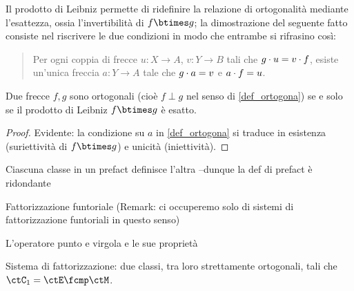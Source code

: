 Il prodotto di Leibniz permette di ridefinire la relazione di ortogonalità mediante l'esattezza, ossia l'invertibilità di \(f\leib g\); la dimostrazione del seguente fatto consiste nel riscrivere le due condizioni in modo che entrambe si rifrasino così:
\begin{quote}
 Per ogni coppia di frecce \(u \colon X\to A\), \(v \colon Y\to B\) tali che \(g\cdot u=v\cdot f\), esiste un'unica freccia \(a \colon Y\to A\) tale che \(g\cdot a=v\) e \(a\cdot f=u\).
\end{quote}
\begin{proposition}
 Due frecce \(f,g\) sono ortogonali (cioè \(f\perp g\) nel senso di \ref{def_ortogona}) se e solo se il prodotto di Leibniz \(f\leib g\) è esatto.
\end{proposition}
\begin{proof}
 Evidente: la condizione su \(a\) in \ref{def_ortogona} si traduce in esistenza (suriettività di \(f\leib g\)) e unicità (iniettività).
\end{proof}
\begin{definition}
 \Todo{}
\end{definition}
\begin{proposition}
 Ciascuna classe in un prefact definisce l'altra --dunque la def di prefact è ridondante
\end{proposition}
\begin{definition}\label{fat_funno}
 Fattorizzazione funtoriale
 (Remark: ci occuperemo solo di sistemi di fattorizzazione funtoriali in questo senso)
\end{definition}
\begin{definition}
 L'operatore punto e virgola e le sue proprietà
\end{definition}
\begin{definition}
 Sistema di fattorizzazione: due classi, tra loro strettamente ortogonali, tali che \(\ctC_1 = \ctE \fcmp \ctM\).
\end{definition}

